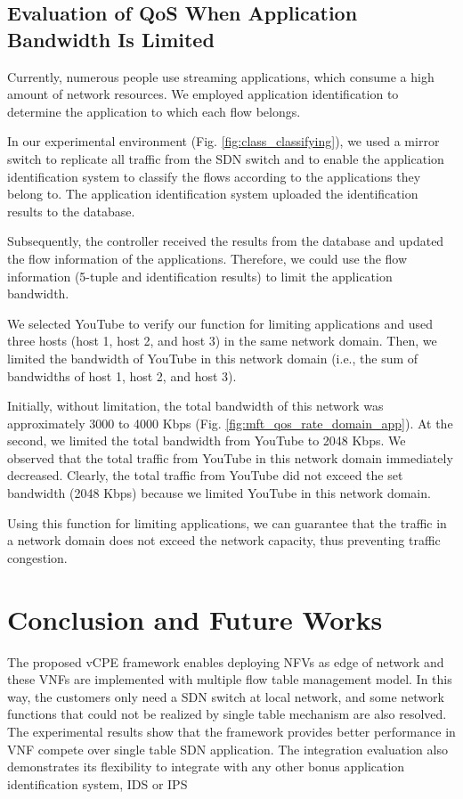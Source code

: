 \documentclass[10pt,journal]{IEEEtran}
\begin{document}
\subsection{Evaluation of QoS When Application Bandwidth Is Limited}
Currently, numerous people use streaming applications, which consume a high amount of network resources. We employed application identification to determine the application to which each flow belongs.

In our experimental environment (Fig. \ref{fig:class_classifying}), we used a mirror switch to replicate all traffic from the SDN switch and to enable the application identification system to classify the flows according to the applications they belong to. The application identification system uploaded the identification results to the database.


Subsequently, the controller received the results from the database and updated the flow information of the applications. Therefore, we could use the flow information (5-tuple and identification results) to limit the application bandwidth.

We selected YouTube to verify our function for limiting applications and used three hosts (host 1, host 2, and host 3) in the same network domain. Then, we limited the bandwidth of YouTube in this network domain (i.e., the sum of bandwidths of host 1, host 2, and host 3).

Initially, without limitation, the total bandwidth of this network was approximately 3000 to 4000 Kbps (Fig. \ref{fig:mft_qos_rate_domain_app}). At the  second, we limited the total bandwidth from YouTube to 2048 Kbps. We observed that the total traffic from YouTube in this network domain immediately decreased. Clearly, the total traffic from YouTube did not exceed the set bandwidth (2048 Kbps) because we limited YouTube in this network domain.

Using this function for limiting applications, we can guarantee that the traffic in a network domain does not exceed the network capacity, thus preventing traffic congestion.



\section{Conclusion and Future Works}
The proposed vCPE framework enables deploying NFVs as edge of network and these VNFs are implemented with multiple flow table management model. In this way, the customers only need a SDN switch at local network, and some network functions that could not be realized by single table mechanism are also resolved. The experimental results show that the framework provides better performance in VNF compete over single table SDN application. The integration evaluation also demonstrates its flexibility to integrate with any other bonus application identification system, IDS or IPS
\end{document}
